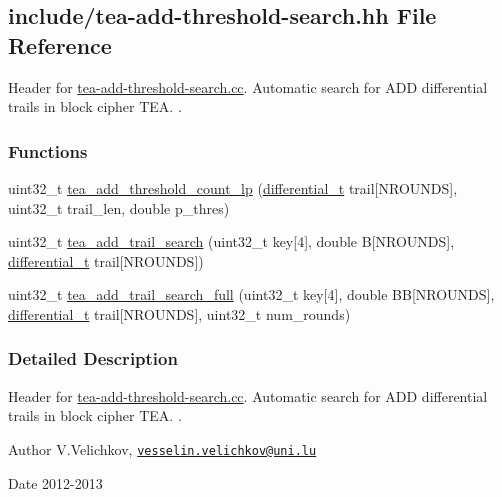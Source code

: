 \hypertarget{tea-add-threshold-search_8hh}{\subsection{include/tea-\/add-\/threshold-\/search.hh \-File \-Reference}
\label{tea-add-threshold-search_8hh}
}


\-Header for \hyperlink{tea-add-threshold-search_8cc}{tea-\/add-\/threshold-\/search.\-cc}. \-Automatic search for \-A\-D\-D differential trails in block cipher \-T\-E\-A. .  


\subsubsection*{\-Functions}
\begin{DoxyCompactItemize}
\item 
uint32\-\_\-t \hyperlink{tea-add-threshold-search_8hh_a50a3716bc83febae5e18ba2934aea8ab}{tea\-\_\-add\-\_\-threshold\-\_\-count\-\_\-lp} (\hyperlink{structdifferential__t}{differential\-\_\-t} trail\mbox{[}\-N\-R\-O\-U\-N\-D\-S\mbox{]}, uint32\-\_\-t trail\-\_\-len, double p\-\_\-thres)
\item 
uint32\-\_\-t \hyperlink{tea-add-threshold-search_8hh_aa0f68e80d4599027b9a5c581891af32f}{tea\-\_\-add\-\_\-trail\-\_\-search} (uint32\-\_\-t key\mbox{[}4\mbox{]}, double \-B\mbox{[}\-N\-R\-O\-U\-N\-D\-S\mbox{]}, \hyperlink{structdifferential__t}{differential\-\_\-t} trail\mbox{[}\-N\-R\-O\-U\-N\-D\-S\mbox{]})
\item 
uint32\-\_\-t \hyperlink{tea-add-threshold-search_8hh_ad67aee37c1fb58e3236ddbe912574538}{tea\-\_\-add\-\_\-trail\-\_\-search\-\_\-full} (uint32\-\_\-t key\mbox{[}4\mbox{]}, double \-B\-B\mbox{[}\-N\-R\-O\-U\-N\-D\-S\mbox{]}, \hyperlink{structdifferential__t}{differential\-\_\-t} trail\mbox{[}\-N\-R\-O\-U\-N\-D\-S\mbox{]}, uint32\-\_\-t num\-\_\-rounds)
\end{DoxyCompactItemize}


\subsubsection{\-Detailed \-Description}
\-Header for \hyperlink{tea-add-threshold-search_8cc}{tea-\/add-\/threshold-\/search.\-cc}. \-Automatic search for \-A\-D\-D differential trails in block cipher \-T\-E\-A. . \begin{DoxyAuthor}{\-Author}
\-V.\-Velichkov, \href{mailto:vesselin.velichkov@uni.lu}{\tt vesselin.\-velichkov@uni.\-lu} 
\end{DoxyAuthor}
\begin{DoxyDate}{\-Date}
2012-\/2013 
\end{DoxyDate}


